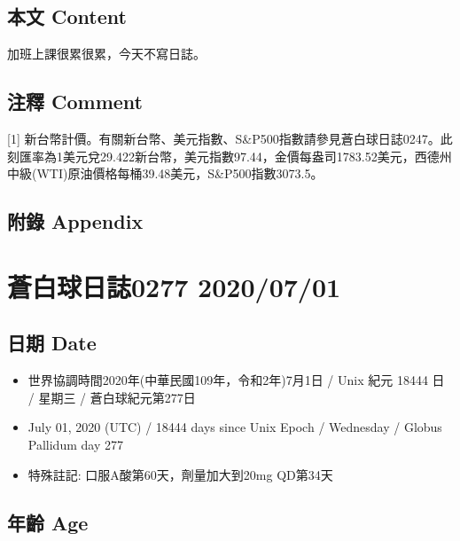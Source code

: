 \documentclass[a5paper, 11pt
]{book}
\providecommand{\tightlist}{%
  \setlength{\itemsep}{0pt}\setlength{\parskip}{0pt}}
\begin{document}
\hypertarget{ux672cux6587-content-29}{%
\subsection{本文 Content}\label{ux672cux6587-content-29}}

加班上課很累很累，今天不寫日誌。

\hypertarget{ux6ce8ux91cb-comment-29}{%
\subsection{注釋 Comment}\label{ux6ce8ux91cb-comment-29}}

{[}1{]}
新台幣計價。有關新台幣、美元指數、S\&P500指數請參見蒼白球日誌0247。此刻匯率為1美元兌29.422新台幣，美元指數97.44，金價每盎司1783.52美元，西德州中級(WTI)原油價格每桶39.48美元，S\&P500指數3073.5。

\hypertarget{ux9644ux9304-appendix-29}{%
\subsection{附錄 Appendix}\label{ux9644ux9304-appendix-29}}

\hypertarget{ux84bcux767dux7403ux65e5ux8a8c0277-20200701}{%
\section{蒼白球日誌0277
2020/07/01}\label{ux84bcux767dux7403ux65e5ux8a8c0277-20200701}}

\hypertarget{ux65e5ux671f-date-30}{%
\subsection{日期 Date}\label{ux65e5ux671f-date-30}}

\begin{itemize}
\tightlist
\item
  世界協調時間2020年(中華民國109年，令和2年)7月1日 / Unix 紀元 18444 日
  / 星期三 / 蒼白球紀元第277日
\item
  July 01, 2020 (UTC) / 18444 days since Unix Epoch / Wednesday / Globus
  Pallidum day 277
\item
  特殊註記: 口服A酸第60天，劑量加大到20mg QD第34天
\end{itemize}

\hypertarget{ux5e74ux9f61-age-30}{%
\subsection{年齡 Age}\label{ux5e74ux9f61-age-30}}
\end{document}
